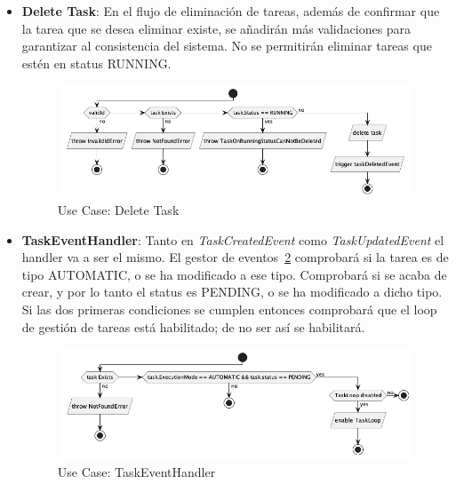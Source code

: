 \begin{itemize}
    \item \textbf{Delete Task}: En el flujo de eliminación de tareas, además de confirmar que la tarea que se desea eliminar existe, se añadirán más validaciones para garantizar al consistencia del sistema.
    No se permitirán eliminar tareas que estén en status RUNNING\@.

    \begin{figure}[H]
        \centering
        \includegraphics[height=0.2\textheight]{./part/Proyecto_ejecutivo/memoria_descriptiva/descripcionDelProyecto/manager/uml/deleteTaskUseCase}
        \caption{Use Case: Delete Task}\label{fig:Use Case-Delete Task}
    \end{figure}

    \item \textbf{TaskEventHandler}: Tanto en \textit{TaskCreatedEvent} como \textit{TaskUpdatedEvent} el handler va a ser el mismo.
    El gestor de eventos~\cref{fig:Use Case-TaskEventHandler} comprobará si la tarea es de tipo AUTOMATIC, o se ha modificado a ese tipo.
    Comprobará si se acaba de crear, y por lo tanto el status es PENDING, o se ha modificado a dicho tipo.
    Si las dos primeras condiciones se cumplen entonces comprobará que el loop de gestión de tareas está habilitado;
    de no ser así se habilitará.

    \begin{figure}[H]
        \centering
        \includegraphics[height=0.2\textheight]{./part/Proyecto_ejecutivo/memoria_descriptiva/descripcionDelProyecto/manager/uml/taskEventHandlerUseCase}
        \caption{Use Case: TaskEventHandler}\label{fig:Use Case-TaskEventHandler}
    \end{figure}


\end{itemize}

